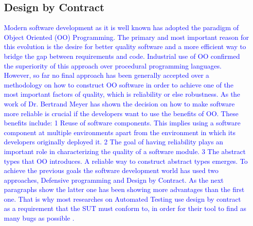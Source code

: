 \subsection{Design by Contract}
\textcolor{blue}{Modern software development as it is well known has adopted the paradigm of Object Oriented (OO) Programming. The primary and most important reason for this evolution is the desire for better quality software and a more efficient way to bridge the gap between requirements and code.
Industrial use of OO confirmed the superiority of this approach over procedural
programming languages. However, so far no final approach has been generally accepted over a methodology on how to construct OO software in order to achieve one of the most important factors of quality, which is reliability or else robustness. As the work of Dr. Bertrand Meyer has shown \cite{meyer1992applying, meyer1988object} the decision on how to make software more reliable is crucial if the developers want to use the benefits of OO. These benefits include:
1 Reuse of software components. This implies using a software component at multiple environments apart from the environment in which its developers originally deployed it.
2 The goal of having reliability plays an important role in characterizing the quality of a software module.
3 The abstract types that OO introduces. A reliable way to construct abstract types emerges. To achieve the previous goals the software development world has used two approaches, Defensive programming and Design by Contract. As the next paragraphs show the latter one has been showing more advantages than the first one. That is why most researches on Automated Testing use design by contract as a requirement that the SUT must conform to, in order for their tool to find as many bugs as possible \cite{Leitner2007}.
}
